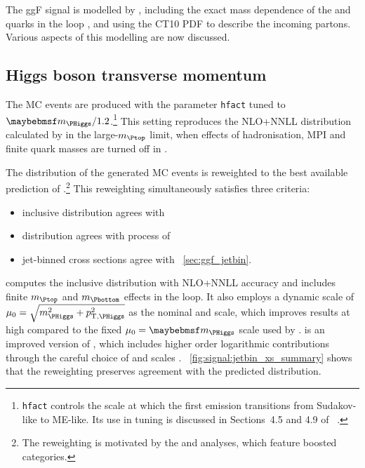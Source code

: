 
The ggF signal is modelled by , including the exact mass 
dependence of the \Ptop and \Pbottom quarks in the loop \cite{Powheg-ggF-quarkmasses}, and 
using the CT10 PDF \cite{CTEQ} to describe the incoming partons. Various aspects of this 
modelling are now discussed.



\subsection{Higgs boson transverse momentum}
\label{sec:ggF:pt}

The MC events are produced with the \powhegbox parameter \verb|hfact| tuned to 
$\mH/1.2$.\footnote{
	\texttt{hfact} controls the scale at which the first emission transitions from 
	Sudakov-like to ME-like. Its use in tuning \ptH is discussed in Sections~4.5 and 4.9 of 
	\Reference~\cite{YR2}.
}
This setting reproduces the NLO+NNLL \ptH distribution calculated by \hqt \cite{HqT2} in 
the large-$m_{\Ptop}$ limit, when effects of hadronisation, MPI and finite quark masses are 
turned off in .

The \ptH distribution of the generated MC events is reweighted to the best available 
prediction of \ptH.\footnote{
	The reweighting is motivated by the \HepProcess{\PHiggs \HepTo \Pphoton\Pphoton} and 
	\HepProcess{\PHiggs \HepTo \Ptau\Ptau} analyses, which feature boosted categories.
}
This reweighting simultaneously satisfies three criteria:
\begin{itemize}[noitemsep,nolistsep]
	\item inclusive \ptH distribution agrees with \hres \cite{HRes}
	\item \twojet \ptH distribution agrees with  process of  \cite{Minlo:Hjj}
	\item jet-binned cross sections agree with \Section~\ref{sec:ggf_jetbin}.
\end{itemize}
\hres computes the inclusive \ptH distribution with NLO+NNLL accuracy and includes finite 
$m_{\Ptop}$ and $m_{\Pbottom}$ effects in the loop. It also employs a dynamic scale of 
$\mu_0 = \sqrt{m_{\PHiggs}^2 + p_{\text{T,\PHiggs}}^2}$ as the nominal \mur and \muf scale, 
which improves results at high \ptH compared to the fixed $\mu_0 = \mH$ scale used by \hqt.
\minlo is an improved version of \powhegbox, which includes higher order logarithmic 
contributions through the careful choice of \mur and \muf scales \cite{Minlo:Hjj}. 
\Figure~\ref{fig:signal:jetbin_xs_summary} shows that the reweighting preserves agreement 
with the predicted \njets distribution.



